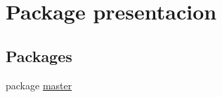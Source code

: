 \hypertarget{namespacepresentacion}{}\section{Package presentacion}
\label{namespacepresentacion}
\subsection*{Packages}
\begin{DoxyCompactItemize}
\item 
package \hyperlink{namespacepresentacion_1_1master}{master}
\end{DoxyCompactItemize}
